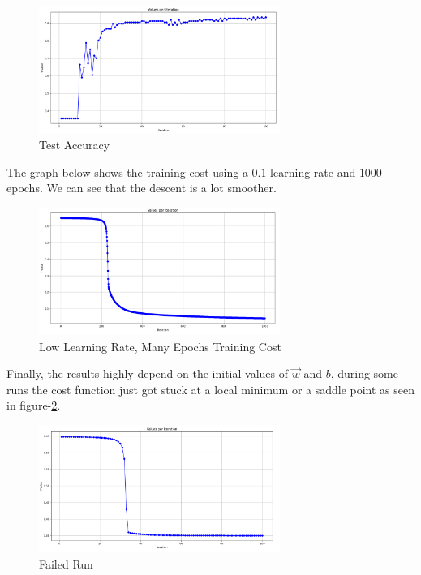 \documentclass{article}
\begin{document}
            \begin{figure}[H]
                \centering
                \includegraphics[width=0.7\textwidth]{cancer-test-acc.png}
                \caption{Test Accuracy}
                \label{fig:cancer-test-acc}
            \end{figure}
            The graph below shows the training cost using a $0.1$ learning rate and $1000$ epochs. We can see that the descent is a lot smoother.
            \begin{figure}[H]
                \centering
                \includegraphics[width=0.7\textwidth]{cancer-low-lr.png}
                \caption{Low Learning Rate, Many Epochs Training Cost}
            \end{figure}
            Finally, the results highly depend on the initial values of $\vec{w}$ and $b$, during some runs the cost function just got stuck at a local minimum or a saddle point as seen in figure-\ref{fig:cancer-sadle}.
            \begin{figure}[H]
                \centering
                \includegraphics[width=0.7\textwidth]{cancer-sadle.png}
                \caption{Failed Run}
                \label{fig:cancer-sadle}
            \end{figure}
\end{document}
